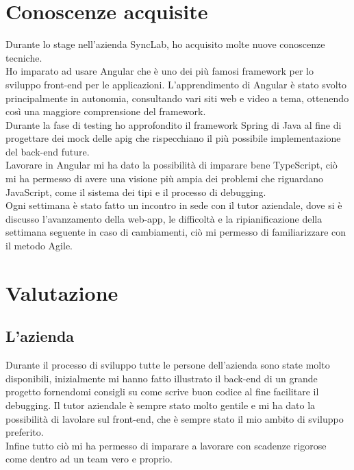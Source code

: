\section{Conoscenze acquisite}
Durante lo stage nell'azienda SyncLab, ho acquisito molte nuove conoscenze tecniche.\\
Ho imparato ad usare Angular che è uno dei più famosi framework per lo sviluppo front-end per le applicazioni. L'apprendimento di Angular è stato svolto principalmente in autonomia, consultando vari siti web e video a tema, ottenendo così una maggiore comprensione del framework.\\
Durante la fase di testing ho approfondito il framework Spring di Java al fine di progettare dei mock delle \gls{apig} che rispecchiano il più possibile implementazione del back-end future.\\
Lavorare in Angular mi ha dato la possibilità di imparare bene TypeScript, ciò mi ha permesso di avere una visione più ampia dei problemi che riguardano JavaScript, come il sistema dei tipi e il processo di debugging.\\
Ogni settimana è stato fatto un incontro in sede con il tutor aziendale, dove si è discusso l'avanzamento della web-app, le difficoltà e la ripianificazione della settimana seguente in caso di cambiamenti, ciò mi permesso di familiarizzare con il metodo Agile.\\

\section{Valutazione}
\subsection{L'azienda}
Durante il processo di sviluppo tutte le persone dell'azienda sono state molto disponibili, inizialmente mi hanno fatto illustrato il back-end di un grande progetto fornendomi consigli su come scrive buon codice al fine facilitare il debugging. Il tutor aziendale è sempre stato molto gentile e mi ha dato la possibilità di lavolare sul front-end, che è sempre stato il mio ambito di sviluppo preferito.\\
Infine tutto ciò mi ha permesso di imparare a lavorare con scadenze rigorose come dentro ad un team vero e proprio.\\

